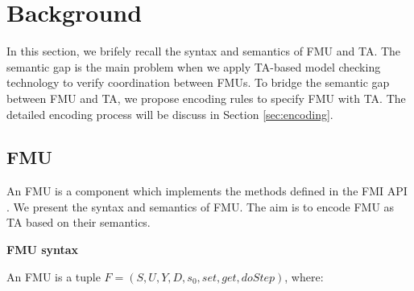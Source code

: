 \section{Background}
\label{sec:fmi}
In this section, we brifely recall the syntax and semantics of FMU and TA. The semantic gap is the main problem when we apply TA-based model checking technology to verify coordination between FMUs. To bridge the semantic gap between FMU and TA, we propose encoding rules to specify FMU with TA. The detailed encoding process will be discuss in Section \ref{sec:encoding}. 

\subsection{FMU}
An FMU is a component which implements the methods defined in the FMI API \cite{Tripakis15}. We present the syntax and semantics of FMU. The aim is to encode FMU as TA based on their semantics.
\begin{definition}
\textbf{FMU syntax}

An FMU is a tuple $F=(S,U,Y,D,s_{0},set,get,doStep)$, where:
\end{definition}
